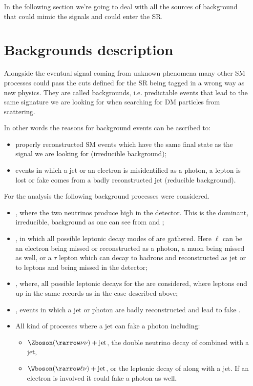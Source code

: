 In the following section we're going to deal with all the sources of background that could mimic the \mph signals and could enter the SR.

\section{Backgrounds description}
\label{sec:bkg}
Alongside the eventual signal coming from unknown phenomena many other SM processes could pass the cuts defined for the SR being tagged in a wrong way as new physics. They are called backgrounds, i.e. predictable events that lead to the same signature we are looking for when searching for DM particles from \pp scattering.

In other words the reasons for background events can be ascribed to:
\begin{itemize}
\item properly reconstructed SM events which have the same final state as the signal we are looking for (irreducible background);
\item events in which a jet or an electron is misidentified as a photon, a lepton is lost or fake \met comes from a badly reconstructed jet (reducible background).
\end{itemize}

For the \mph analysis the following background processes were considered.
\begin{itemize}
\item \znng, where the two neutrinos produce high \met in the detector. This is the dominant, irreducible, background as one can see from \Fig{\ref{subfig:SRp}} and \Fig{\ref{subfig:SRm}};
\item \wg, in which all possible leptonic decay modes of \Wboson are gathered. Here $\ell$ can be an electron being missed or reconstructed as a photon, a muon being missed as well, or a $\tau$ lepton which can decay to hadrons and reconstructed as jet or to leptons and being missed in the detector;
\item \zg, where, all possible leptonic decays for the \Zboson are considered, where leptons end up in the same records as in the \Wboson case described above;
\item \gj, events in which a jet or photon are badly reconstructed and lead to fake \met.
\item All kind of processes where a jet can fake a photon including:
  \begin{itemize}
  \item $\Zboson(\rarrow \nu\nu) + \text{jet}$, the double neutrino decay of \Zboson combined with a jet,
  \item $\Wboson(\rarrow \ell\nu) + \text{jet}$, or the leptonic decay of \Wboson along with a jet. If an electron is involved it could fake a photon as well.
  \end{itemize}
\end{itemize}

